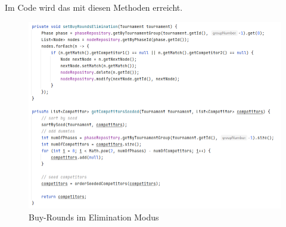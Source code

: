 Im Code wird das mit diesen Methoden erreicht.

\begin{figure}[H]
    \includegraphics[scale=0.65]{pics/elimination_setBuyRounds.png}
    \caption{Buy-Rounds im Elimination Modus}
\end{figure}

